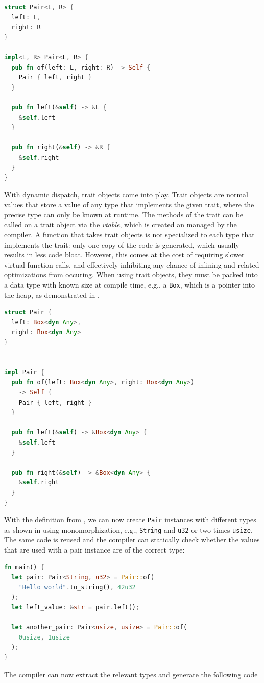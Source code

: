 \documentclass[paper=a4,%
  twoside,%
  BCOR4mm,%
  abstract=true,%
  toc=bibliography,%
  chapterprefix=true,%
  toc=bibliographynumbered,%
  open=right,%
  english,%
  pagesize=pdftex]{scrreprt}
\begin{document}
\begin{lstlisting}[language=Rust, style=boxed, caption={A data type with static dispatch via monomorphization}, label=lst:static-dispatch]
struct Pair<L, R> {
  left: L,
  right: R
}

impl<L, R> Pair<L, R> {
  pub fn of(left: L, right: R) -> Self {
    Pair { left, right }
  }

  pub fn left(&self) -> &L {
    &self.left
  }

  pub fn right(&self) -> &R {
    &self.right
  }
}
\end{lstlisting}

With dynamic dispatch, trait objects come into play. Trait objects are normal values that store a value of any type that implements the given trait, where the precise type can only be known at runtime. The methods of the trait can be called on a trait object via the \textit{vtable}, which is created an managed by the compiler. A function that takes trait objects is not specialized to each type that implements the trait: only one copy of the code is generated, which usually results in less code bloat. However, this comes at the cost of requiring slower virtual function calls, and effectively inhibiting any chance of inlining and related optimizations from occuring. When using trait objects, they must be packed into a data type with known size at compile time, e.g., a \lstinline{Box}, which is a pointer into the heap, as demonstrated in .

\begin{lstlisting}[language=Rust, style=boxed, caption=A data type with dynamic dispatch, label=lst:dynamic-dispatch]
struct Pair {
  left: Box<dyn Any>,
  right: Box<dyn Any>
}


impl Pair {
  pub fn of(left: Box<dyn Any>, right: Box<dyn Any>)
    -> Self {
    Pair { left, right }
  }

  pub fn left(&self) -> &Box<dyn Any> {
    &self.left
  }

  pub fn right(&self) -> &Box<dyn Any> {
    &self.right
  }
}
\end{lstlisting}

With the definition from , we can now create \lstinline{Pair} instances with different types as shown in  using monomorphization, e.g., \lstinline{String} and \lstinline{u32} or two times \lstinline{usize}. The same code is reused and the compiler can statically check whether the values that are used with a pair instance are of the correct type:
\begin{lstlisting}[language=Rust, style=boxed, caption={}, label=lst:example-generics-usage]
fn main() {
  let pair: Pair<String, u32> = Pair::of(
    "Hello world".to_string(), 42u32
  );
  let left_value: &str = pair.left();

  let another_pair: Pair<usize, usize> = Pair::of(
    0usize, 1usize
  );
}
\end{lstlisting}
The compiler can now extract the relevant types and generate the following code
\end{document}
